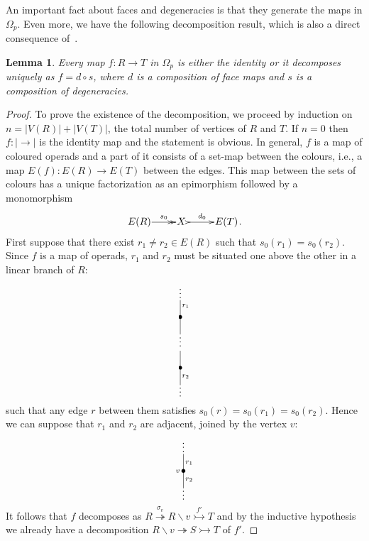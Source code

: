 \documentclass[a4paper]{amsart}
\theoremstyle{plain}
\newtheorem{lem}[thm]{Lemma}
\theoremstyle{definition}
\theoremstyle{remark}
\newcommand{\rpd}{\Omega_p}
\newcommand{\To}{\longrightarrow}
\numberwithin{equation}{section}
\numberwithin{figure}{section}
\begin{document}
An important fact about faces and degeneracies is that they generate the maps in $\rpd$. Even more, we have the following
decomposition result, which is also a direct consequence of~\cite[Theorem 2.3.27]{Wei07}.
\begin{lem}\label{unique decomposition}
    Every map $f:R\To T$ in $\rpd$ is either the identity or it decomposes uniquely as $f=d\circ s$, where $d$ is a composition
    of face
    maps and $s$ is a composition of degeneracies.
\end{lem}
\begin{proof}
    To prove the existence of the decomposition, we proceed by induction
    on $n=|V(R)|+|V(T)|$, the total number of vertices of $R$ and $T$.
    If $n=0$ then $f:|\To |$ is the identity map and the statement is
    obvious. In general, $f$ is a map of coloured operads and a part of
    it consists of a set-map between the colours, i.e., a map
    $E(f)\colon E(R)\To E(T)$ between the edges. This map between the
    sets of colours has a unique factorization as an epimorphism
    followed by a monomorphism
    $$
        \xymatrix@1{E(R)\ar@{->>}[r]^-{s_0}&X\ \ar@{>->}[r]^-{d_0}&E(T)}.
    $$
    First suppose that there exist $r_1\neq r_2\in E(R)$ such that $s_0(r_1)=s_0(r_2)$. Since $f$ is a map of operads, $r_1$ and
    $r_2$ must be situated one above the other in a linear branch of $R$:
    $$
        \xy<0.1cm,0cm>:
        (0, 15.5)*{\vdots};
        (0, -19.5)*{\vdots};
        (2,10)*{\scriptstyle r_1};
        (2,-15)*{\scriptstyle r_2};
        (0,12)*=0{}="2";
        (0,6)*=0{\bullet}="3";
        (0,0)*=0{}="4";
        (0,-1.7)*=0{\vdots}="5";
        (0,-6)*=0{}="6";
        (0,-12)*=0{\bullet}="7";
        (0,-18)*=0{}="8";
        "2";"3" **\dir{-};
        "3";"4" **\dir{-};
        "6";"7" **\dir{-};
        "7";"8" **\dir{-};
        \endxy
    $$
    such that any edge $r$ between them satisfies $s_0(r)=s_0(r_1)=s_0(r_2)$. Hence we can suppose that $r_1$ and $r_2$ are
    adjacent, joined by the vertex $v$:
    $$
        \xy<0.1cm,0cm>:
        (0, 9.5)*{\vdots};
        (0, -7.5)*{\vdots};
        (2,3)*{\scriptstyle r_1};
        (2,-3)*{\scriptstyle r_2};
        (-2,0)*{\scriptstyle v};
        (0,6)*=0{}="1";
        (0,0)*=0{\bullet}="2";
        (0,-6)*=0{}="3";
        "1";"2" **\dir{-};
        "2";"3" **\dir{-};
        \endxy
    $$
    It follows that $f$ decomposes as $R\stackrel{\sigma_v}{\twoheadrightarrow} R\backslash v\stackrel{f'}{\rightarrowtail}T$ and by the inductive
    hypothesis we already have a decomposition $R\backslash v\twoheadrightarrow S\rightarrowtail T$ of $f'$.


\end{proof}
\end{document}
